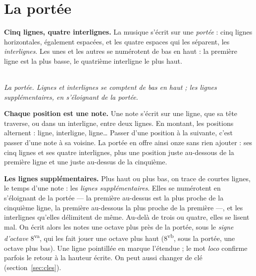 \documentclass[a4paper,11pt]{article}
\newcommand{\legende}[1]{\\[4pt]{\small\itshape\color{mygray} #1}}
\begin{document}
\section{La portée}
\label{sec:portee}

\textbf{Cinq lignes, quatre interlignes.} La musique s'écrit sur une
\emph{portée} : cinq lignes horizontales, également espacées, et les quatre
espaces qui les séparent, les \emph{interlignes}. Les unes et les autres se
numérotent de bas en haut : la première ligne est la plus basse, le quatrième
interligne le plus haut.

\begin{center}
\legende{La portée. Lignes et interlignes se comptent de bas en haut ; les
lignes supplémentaires, en s'éloignant de la portée.}
\end{center}

\textbf{Chaque position est une note.} Une note s'écrit sur une ligne, que sa
tête traverse, ou dans un interligne, entre deux lignes. En montant, les
positions alternent : ligne, interligne, ligne… Passer d'une position à la
suivante, c'est passer d'une note à sa voisine. La portée en offre ainsi onze
sans rien ajouter : ses cinq lignes et ses quatre interlignes, plus une
position juste au-dessous de la première ligne et une juste au-dessus de la
cinquième.

\textbf{Les lignes supplémentaires.} Plus haut ou plus bas, on trace de
courtes lignes, le temps d'une note : les \emph{lignes supplémentaires}. Elles
se numérotent en s'éloignant de la portée --- la première au-dessus est la plus
proche de la cinquième ligne, la première au-dessous la plus proche de la
première ---, et les interlignes qu'elles délimitent de même. Au-delà de trois
ou quatre, elles se lisent mal. On écrit alors les notes une octave plus près
de la portée, sous le \emph{signe d'octave} 8\textsuperscript{va}, qui les
fait jouer une octave plus haut (8\textsuperscript{vb}, sous la portée, une
octave plus bas). Une ligne pointillée en marque l'étendue ; le mot
\emph{loco} confirme parfois le retour à la hauteur écrite. On peut aussi
changer de clé (section~\ref{sec:cles}).
\end{document}
